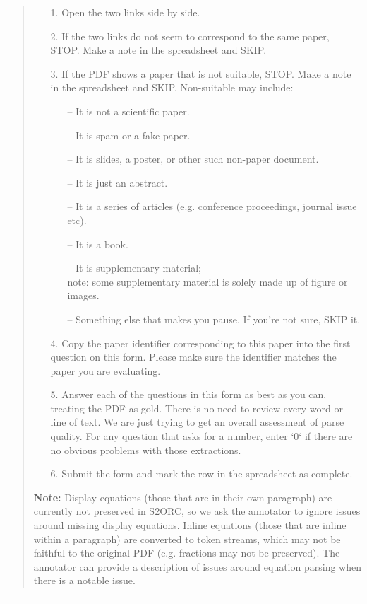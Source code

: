 \begin{quote}
\begin{enumerate}
    \item[1.] Open the two links side by side.
    \item[2.] If the two links do not seem to correspond to the same paper, STOP. Make a note in the spreadsheet and SKIP.
    \item[3.] If the PDF shows a paper that is not suitable, STOP. Make a note in the spreadsheet and SKIP. Non-suitable may include:
    \begin{itemize}
        \item[--] It is not a scientific paper.
        \item[--] It is spam or a fake paper.
        \item[--] It is slides, a poster, or other such non-paper document.
        \item[--] It is just an abstract.
        \item[--] It is a series of articles (e.g. conference proceedings, journal issue etc).
        \item[--] It is a book.
        \item[--] It is supplementary material; \\
        note: some supplementary material is solely made up of figure or images.
        \item[--] Something else that makes you pause. If you're not sure, SKIP it. 
    \end{itemize}
    \item[4.] Copy the paper identifier corresponding to this paper into the first question on this form. Please make sure the identifier matches the paper you are evaluating.
    \item[5.] Answer each of the questions in this form as best as you can, treating the PDF as gold. There is no need to review every word or line of text. We are just trying to get an overall assessment of parse quality. For any question that asks for a number, enter `0` if there are no obvious problems with those extractions.
    \item[6.] Submit the form and mark the row in the spreadsheet as complete.
\end{enumerate}

\vspace{4pt}\noindent\textbf{Note:} Display equations (those that are in their own paragraph) are currently not preserved in S2ORC, so we ask the annotator to ignore issues around missing display equations. Inline equations (those that are inline within a paragraph) are converted to token streams, which may not be faithful to the original PDF (e.g. fractions may not be preserved). The annotator can provide a description of issues around equation parsing when there is a notable issue.
\end{quote}
\begin{center}
\noindent \rule{0.9\linewidth}{0.4pt}
\end{center}

